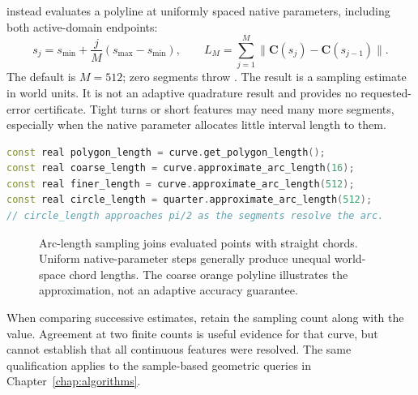  instead evaluates a polyline at
uniformly spaced native parameters, including both active-domain endpoints:
\begin{equation}
 s_j=s_\mathrm{min}+\frac{j}{M}(s_\mathrm{max}-s_\mathrm{min}),\qquad
 L_M=\sum_{j=1}^{M}\|\mathbf C(s_j)-\mathbf C(s_{j-1})\|.
\end{equation}
The default is $M=512$; zero segments throw .
The result is a sampling estimate in world units. It is not an adaptive
quadrature result and provides no requested-error certificate. Tight turns
or short features may need many more segments, especially when the native
parameter allocates little interval length to them.

\begin{lstlisting}[language=C++,caption={Compare a control polygon with sampled curve lengths.}]
const real polygon_length = curve.get_polygon_length();
const real coarse_length = curve.approximate_arc_length(16);
const real finer_length = curve.approximate_arc_length(512);
const real circle_length = quarter.approximate_arc_length(512);
// circle_length approaches pi/2 as the segments resolve the arc.
\end{lstlisting}

\begin{figure}[tbp]
\centering
{}
\caption{Arc-length sampling joins evaluated points with straight chords.
Uniform native-parameter steps generally produce unequal world-space chord
lengths. The coarse orange polyline illustrates the approximation, not an
adaptive accuracy guarantee.}
\label{fig:spline-length}
\end{figure}

When comparing successive estimates, retain the sampling count along with
the value. Agreement at two finite counts is useful evidence for that curve,
but cannot establish that all continuous features were resolved. The same
qualification applies to the sample-based geometric queries in
Chapter~\ref{chap:algorithms}.

